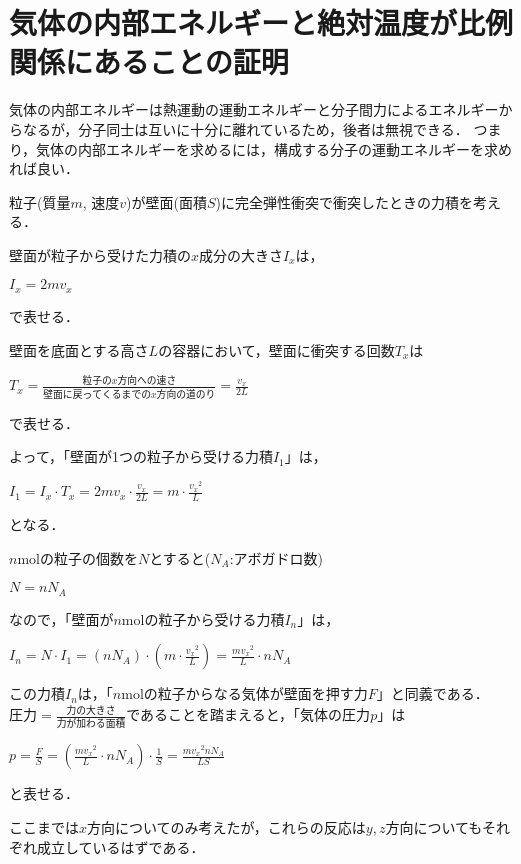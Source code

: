 \hypertarget{ux6c17ux4f53ux306eux5185ux90e8ux30a8ux30cdux30ebux30aeux30fcux3068ux7d76ux5bfeux6e29ux5ea6ux304cux6bd4ux4f8bux95a2ux4fc2ux306bux3042ux308bux3053ux3068ux306eux8a3cux660e}{%
\section{気体の内部エネルギーと絶対温度が比例関係にあることの証明}\label{ux6c17ux4f53ux306eux5185ux90e8ux30a8ux30cdux30ebux30aeux30fcux3068ux7d76ux5bfeux6e29ux5ea6ux304cux6bd4ux4f8bux95a2ux4fc2ux306bux3042ux308bux3053ux3068ux306eux8a3cux660e}}

気体の内部エネルギーは熱運動の運動エネルギーと分子間力によるエネルギーからなるが，分子同士は互いに十分に離れているため，後者は無視できる．
つまり，気体の内部エネルギーを求めるには，構成する分子の運動エネルギーを求めれば良い．

粒子(質量\(m\),
速度\(v\))が壁面(面積\(S\))に完全弾性衝突で衝突したときの力積を考える．

壁面が粒子から受けた力積の\(x\)成分の大きさ\(I_x\)は，

\({I_x}=2m{v_x}\)

で表せる．

壁面を底面とする高さ\(L\)の容器において，壁面に衝突する回数\(T_x\)は

\({T_x} = \frac{粒子のx方向への速さ}{壁面に戻ってくるまでのx方向の道のり} = \frac{v_x}{2L}\)

で表せる．

よって，「壁面が1つの粒子から受ける力積\(I_1\)」は，

\({I_1}={I_x}\cdot{T_x}=2{m}{v_x}\cdot\frac{v_x}{2L}={m}\cdot\frac{{{v_x}^2}}{L}\)

となる．

\(n\)molの粒子の個数を\(N\)とすると(\(N_A\):アボガドロ数)

\(N=n{N_A}\)

なので，「壁面が\(n\)molの粒子から受ける力積\(I_n\)」は，

\({I_n}={N}\cdot{I_1}=(n{N_A})\cdot({m}\cdot\frac{{{v_x}^2}}{L})=\frac{m{{v_x}^2}}{L}\cdot{n{N_A}}\)

この力積\(I_n\)は，「\(n\)molの粒子からなる気体が壁面を押す力\(F\)」と同義である．
\(圧力=\frac{力の大きさ}{力が加わる面積}\)であることを踏まえると，「気体の圧力\(p\)」は

\(p=\frac{F}{S}=(\frac{m{{v_x}^2}}{L}\cdot{n{N_A}})\cdot\frac{1}{S}=\frac{m{{v_x}^2}n{N_A}}{LS}\)

と表せる．

ここまでは\(x\)方向についてのみ考えたが，これらの反応は\(y, z\)方向についてもそれぞれ成立しているはずである．

